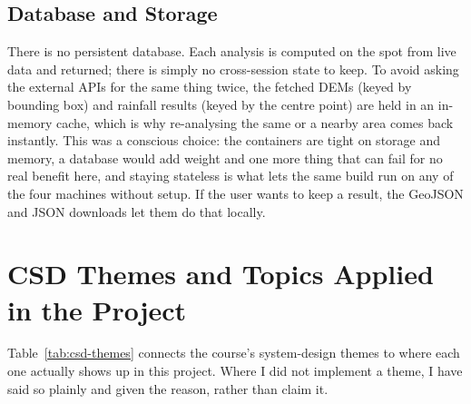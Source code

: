 \documentclass[manuscript,screen]{acmart}
\begin{document}
\subsection{Database and Storage}
\label{sec:db}
There is no persistent database. Each analysis is computed on the spot from live
data and returned; there is simply no cross-session state to keep. To avoid asking
the external APIs for the same thing twice, the fetched DEMs (keyed by bounding
box) and rainfall results (keyed by the centre point) are held in an in-memory
cache, which is why re-analysing the same or a nearby area comes back instantly.
This was a conscious choice: the containers are tight on storage and memory, a
database would add weight and one more thing that can fail for no real benefit
here, and staying stateless is what lets the same build run on any of the four
machines without setup. If the user wants to keep a result, the GeoJSON and JSON
downloads let them do that locally.

\section{CSD Themes and Topics Applied in the Project}
\label{sec:csd-themes}
Table~\ref{tab:csd-themes} connects the course's system-design themes to where each
one actually shows up in this project. Where I did not implement a theme, I have
said so plainly and given the reason, rather than claim it.
\end{document}

